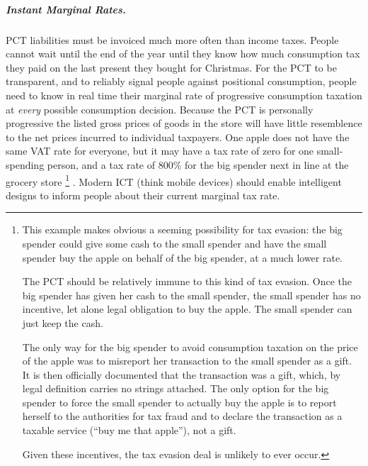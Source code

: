 \subparagraph{Instant Marginal Rates.} PCT liabilities must be invoiced much more often than income taxes.
People cannot wait until the end of the year until they know how much consumption tax they paid on the last present they bought for Christmas.
For the PCT to be transparent, and to reliably signal people against positional consumption, people need to know in real time their marginal rate of progressive consumption taxation at \emph{every} possible consumption decision.
Because the PCT is personally progressive the listed gross prices of goods in the store will have little resemblence to the net prices incurred to individual taxpayers.
One apple does not have the same VAT rate for everyone, but it may have a tax rate of zero for one small-spending person, and a tax rate of 800\% for the big spender next in line at the grocery store
\footnote{
	This example makes obvious a seeming possibility for tax evasion:
	the big spender could give some cash to the small spender and have the small spender buy the apple on behalf of the big spender, at a much lower rate.

	The PCT should be relatively immune to this kind of tax evasion.
	Once the big spender has given her cash to the small spender, the small spender has no incentive, let alone legal obligation to buy the apple.
	The small spender can just keep the cash.

	The only way for the big spender to avoid consumption taxation on the price of the apple was to misreport her transaction to the small spender as a gift.
	It is then officially documented that the transaction was a gift, which, by legal definition carries no strings attached.
	The only option for the big spender to force the small spender to actually buy the apple is to report herself to the authorities for tax fraud and to declare the transaction as a taxable service (``buy me that apple''), not a gift.

	Given these incentives, the tax evasion deal is unlikely to ever occur.
}
.
Modern ICT (think mobile devices) should enable intelligent designs to inform people about their current marginal tax rate.


